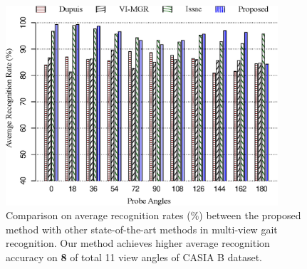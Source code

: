 \begin{figure}
	\centering
	\includegraphics[width= 0.9\textwidth]{figures/comp_casia_b_multi_view.eps}
	\caption [Comparison on average recognition rates (\%) between the proposed method with other state-of-the-art methods in multi-view gait recognition]{
		Comparison on average recognition rates (\%) between the proposed method with other state-of-the-art methods in multi-view gait recognition. Our method achieves higher average recognition accuracy on \textbf{8 } of total 11 view angles of CASIA B dataset. \label{fig:comp_casia_b_multi_view}
	}

\end{figure}

